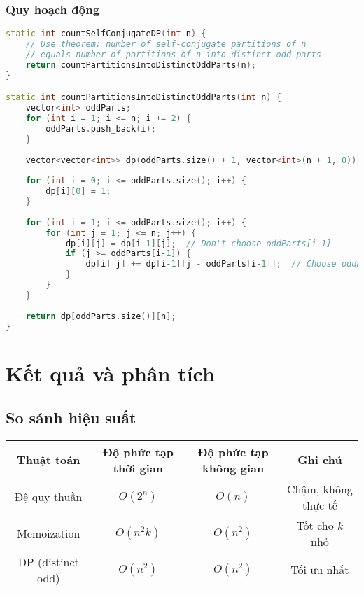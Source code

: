 \documentclass[12pt,a4paper]{article}
\theoremstyle{definition}
\begin{document}
\subsubsection{Quy hoạch động}

\begin{lstlisting}[language=C++, caption=Đếm phân hoạch tự liên hợp - DP]
static int countSelfConjugateDP(int n) {
    // Use theorem: number of self-conjugate partitions of n
    // equals number of partitions of n into distinct odd parts
    return countPartitionsIntoDistinctOddParts(n);
}

static int countPartitionsIntoDistinctOddParts(int n) {
    vector<int> oddParts;
    for (int i = 1; i <= n; i += 2) {
        oddParts.push_back(i);
    }
    
    vector<vector<int>> dp(oddParts.size() + 1, vector<int>(n + 1, 0));
    
    for (int i = 0; i <= oddParts.size(); i++) {
        dp[i][0] = 1;
    }
    
    for (int i = 1; i <= oddParts.size(); i++) {
        for (int j = 1; j <= n; j++) {
            dp[i][j] = dp[i-1][j];  // Don't choose oddParts[i-1]
            if (j >= oddParts[i-1]) {
                dp[i][j] += dp[i-1][j - oddParts[i-1]];  // Choose oddParts[i-1]
            }
        }
    }
    
    return dp[oddParts.size()][n];
}
\end{lstlisting}

\section{Kết quả và phân tích}

\subsection{So sánh hiệu suất}

\begin{center}
\begin{tabular}{|c|c|c|c|}
\hline
Thuật toán & Độ phức tạp thời gian & Độ phức tạp không gian & Ghi chú \\
\hline
Đệ quy thuần & $O(2^n)$ & $O(n)$ & Chậm, không thực tế \\
\hline
Memoization & $O(n^2 k)$ & $O(n^2)$ & Tốt cho $k$ nhỏ \\
\hline
DP (distinct odd) & $O(n^2)$ & $O(n^2)$ & Tối ưu nhất \\
\hline
\end{tabular}
\end{center}
\end{document}
